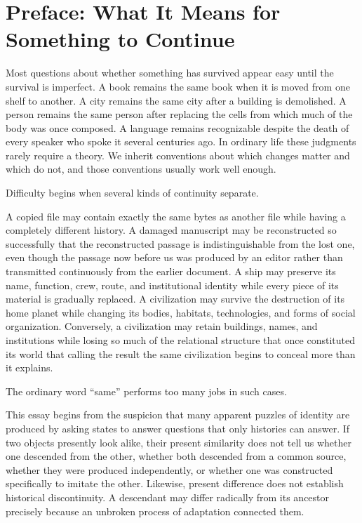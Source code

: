 \documentclass[
  11pt,
  a4paper,
  DIV=12,
  BCOR=0mm,
  parskip=half-
]{scrartcl}
\theoremstyle{definition}
\theoremstyle{plain}
\theoremstyle{remark}
\begin{document}
\clearpage


\section*{Preface: What It Means for Something to Continue}

Most questions about whether something has survived appear easy until the
survival is imperfect. A book remains the same book when it is moved from one
shelf to another. A city remains the same city after a building is demolished.
A person remains the same person after replacing the cells from which much of
the body was once composed. A language remains recognizable despite the death
of every speaker who spoke it several centuries ago. In ordinary life these
judgments rarely require a theory. We inherit conventions about which changes
matter and which do not, and those conventions usually work well enough.

Difficulty begins when several kinds of continuity separate.

A copied file may contain exactly the same bytes as another file while having
a completely different history. A damaged manuscript may be reconstructed so
successfully that the reconstructed passage is indistinguishable from the lost
one, even though the passage now before us was produced by an editor rather
than transmitted continuously from the earlier document. A ship may preserve
its name, function, crew, route, and institutional identity while every piece
of its material is gradually replaced. A civilization may survive the
destruction of its home planet while changing its bodies, habitats,
technologies, and forms of social organization. Conversely, a civilization may
retain buildings, names, and institutions while losing so much of the
relational structure that once constituted its world that calling the result
the same civilization begins to conceal more than it explains.

The ordinary word \enquote{same} performs too many jobs in such cases.

This essay begins from the suspicion that many apparent puzzles of identity
are produced by asking states to answer questions that only histories can
answer. If two objects presently look alike, their present similarity does not
tell us whether one descended from the other, whether both descended from a
common source, whether they were produced independently, or whether one was
constructed specifically to imitate the other. Likewise, present difference
does not establish historical discontinuity. A descendant may differ radically
from its ancestor precisely because an unbroken process of adaptation connected
them.
\end{document}
